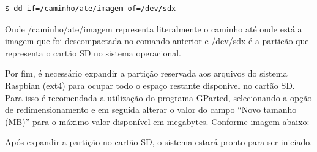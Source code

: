 \begin{lstlisting}[language=bash]
$ dd if=/caminho/ate/imagem of=/dev/sdx
\end{lstlisting}

Onde /caminho/ate/imagem representa literalmente o caminho até onde está a imagem que foi descompactada no comando anterior e /dev/sdx é a particão que representa o cartão SD no sistema operacional.

Por fim, é necessário expandir a partição reservada aos arquivos do sistema Raspbian (ext4) para ocupar todo o espaço restante disponível no cartão SD. Para isso é recomendada a utilização do programa GParted, selecionando a opção de redimensionamento e em seguida alterar o valor do campo ``Novo tamanho (MB)'' para o máximo valor disponível em megabytes. Conforme imagem abaixo:

\begin{figure}[h!]
	\centering
\end{figure}

Após expandir a partição no cartão SD, o sistema estará pronto para ser iniciado.

\begin{figure}[h!]
	\centering
\end{figure}

